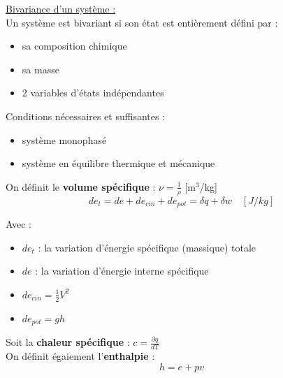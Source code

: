 \documentclass[../main.tex]{subfiles}
\begin{document}
\quad \underline{Bivariance d'un système :}\\
Un système est bivariant si son état est entièrement défini par : \begin{itemize}
    \item sa composition chimique\\
    \item sa masse\\
    \item 2 variables d'états indépendantes\\
\end{itemize}

Conditions nécessaires et suffisantes : \begin{itemize}
    \item système monophasé\\
    \item système en équilibre thermique et mécanique\\
\end{itemize}

On définit le \textbf{volume spécifique} : $\nu = \frac{1}{\rho}$ [m$^3$/kg]\\

\begin{equation}
    de_t = de + de_{cin} + de_{pot} = \delta q + \delta w \quad [J/kg]
\end{equation}

Avec : \begin{itemize}
    \item $de_t$ : la variation d'énergie spécifique (massique) totale\\
    \item $de$ : la variation d'énergie interne spécifique\\
    \item $de_{cin} = \frac{1}{2}V^2$\\
    \item $de_{pot} = gh$\\
\end{itemize}

Soit la \textbf{chaleur spécifique} : $c = \frac{\partial q}{dT}$\\
On définit égaiement l'\textbf{enthalpie} : \begin{equation}
    h = e+pv
\end{equation}
\end{document}
